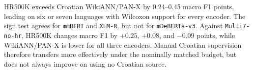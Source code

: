 \documentclass{article}
\begin{document}
\begin{table}[H]
\centering
\caption{RQ2 Croatian source-quality ablation. Scores are macro F1 over $L_7$, and the paired contrast compares HR500K with Croatian WikiANN/PAN-X.}
\label{tab:croatian_ablation}
\end{table}

HR500K exceeds Croatian WikiANN/PAN-X by 0.24--0.45 macro F1 points, leading on six or seven languages with Wilcoxon support for every encoder.
The sign test agrees for \texttt{mmBERT} and \texttt{XLM-R}, but not for \texttt{mDeBERTa-v3}.
Against \texttt{Multi7-no-hr}, HR500K changes macro F1 by $+0.25$, $+0.08$, and $-0.09$ points, while WikiANN/PAN-X is lower for all three encoders.
Manual Croatian supervision therefore transfers more effectively under the nominally matched budget, but does not always improve on using no Croatian source.
\end{document}
